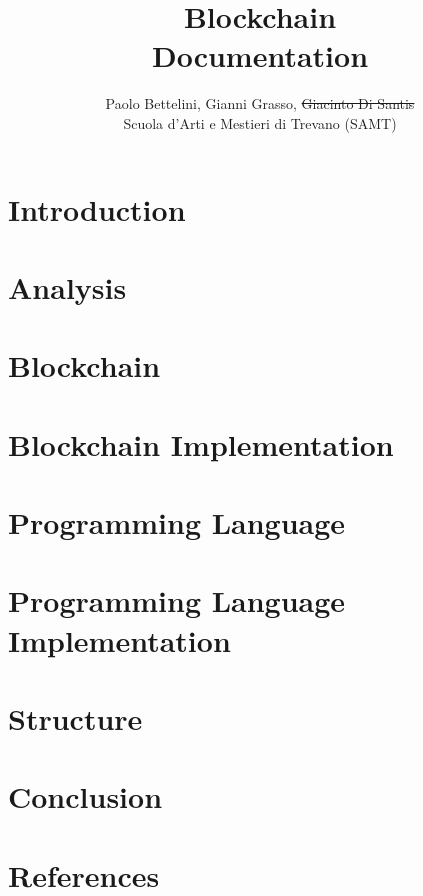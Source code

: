 \documentclass{article}
\title{
    Blockchain \\
    \large Documentation}
\author{
    Paolo Bettelini, Gianni Grasso, \sout{Giacinto Di Santis} \\
    \large Scuola d'Arti e Mestieri di Trevano (SAMT)}
\date{}
\begin{document}
\maketitle

\pagebreak

\tableofcontents

\pagebreak

\section{Introduction}



\pagebreak

\section{Analysis}



\pagebreak

\section{Blockchain}



\pagebreak

\section{Blockchain Implementation}



\pagebreak

\section{Programming Language}



\pagebreak

\section{Programming Language Implementation}



\pagebreak

\section{Structure}



\pagebreak

\section{Conclusion}



\pagebreak

\section{References}

\nocite{*} %

\printbibliography[type=online, heading=subbibliography, title=Sitography]
\end{document}
